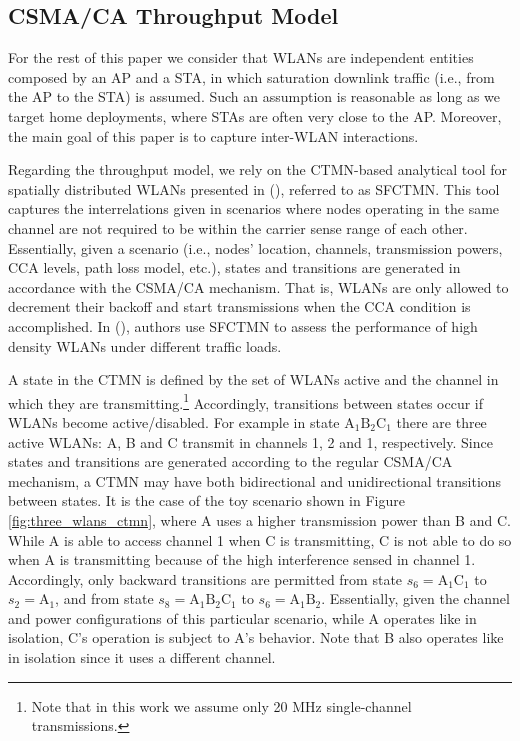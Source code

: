 \documentclass{article}
\begin{document}
\subsection{CSMA/CA Throughput Model}
\label{section:throughput_model}		
For the rest of this paper we consider that WLANs are independent entities composed by an AP and a STA, in which saturation downlink traffic (i.e., from the AP to the STA) is assumed. Such an assumption is  reasonable as long as we target home deployments, where STAs are often very close to the AP. Moreover, the main goal of this paper is to capture inter-WLAN interactions.

Regarding the throughput model, we rely on the CTMN-based analytical tool for spatially distributed WLANs presented in (\citealp{barrachina2018performance}), referred to as SFCTMN. This tool captures the interrelations given in scenarios where nodes operating in the same channel are not required to be within the carrier sense range of each other. Essentially, given a scenario (i.e., nodes' location, channels, transmission powers, CCA levels, path loss model, etc.), states and transitions are generated in accordance with the CSMA/CA mechanism. That is, WLANs are only allowed to decrement their backoff and start transmissions when the CCA condition is accomplished. In (\citealp{barrachina2018overlap}), authors use SFCTMN to assess the performance of high density WLANs under different traffic loads.

A state in the CTMN is defined by the set of WLANs active and the channel in which they are transmitting.\footnote{Note that in this work we assume only 20 MHz single-channel transmissions.} Accordingly, transitions between states occur if WLANs become active/disabled. For example in state $\text{A}_1 \text{B}_2 \text{C}_1$ there are three active WLANs: A, B and C transmit in channels 1, 2 and 1, respectively. Since states and transitions are generated according to the regular CSMA/CA mechanism, a CTMN may have both bidirectional and unidirectional transitions between states. It is the case of the toy scenario shown in Figure \ref{fig:three_wlans_ctmn}, where A uses a higher transmission power than B and C. While A is able to access channel 1 when C is transmitting, C is not able to do so when A is transmitting because of the high interference sensed in channel 1. Accordingly, only backward transitions are permitted from state $s_6 = \text{A}_1 \text{C}_1$ to $s_2 = \text{A}_1$, and from state $s_8 = \text{A}_1 \text{B}_2 \text{C}_1$ to $s_6 = \text{A}_1 \text{B}_2$. Essentially, given the channel and power configurations of this particular scenario, while A operates like in isolation, C's operation is subject to A's behavior. Note that B also operates like in isolation since it uses a different channel.
\end{document}
